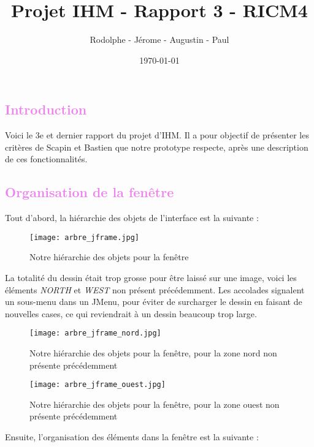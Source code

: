 \documentclass[12pt, a4paper]{article}
\title{Projet IHM - Rapport 3 - RICM4}
\author{\bsc{Fréby} Rodolphe - \bsc{Barbier} Jérome - \bsc{Husson} Augustin - \bsc{Labat} Paul}
\date{\today}
\begin{document}
\maketitle
\tableofcontents
\newpage

\textcolor{Violet}{\section{Introduction}}
Voici le 3e et dernier rapport du projet d'IHM. Il a pour objectif de présenter les critères de Scapin et Bastien que notre prototype respecte, après une description de ces fonctionnalités.

\textcolor{Violet}{\section{Organisation de la fenêtre}}

Tout d'abord, la hiérarchie des objets de l'interface est la suivante :

\begin{figure}[h]
\begin{center}
   \texttt{[image: arbre\_jframe.jpg]}
	\caption{Notre hiérarchie des objets pour la fenêtre}
	\end{center}
\end{figure}

La totalité du dessin était trop grosse pour être laissé sur une image, voici les éléments \emph{NORTH} et \emph{WEST} non présent précédemment. Les accolades signalent un sous-menu dans un JMenu, pour éviter de surcharger le dessin en faisant de nouvelles cases, ce qui reviendrait à un dessin beaucoup trop large.
\newpage
\begin{figure}[h]
\begin{center}
   \texttt{[image: arbre\_jframe\_nord.jpg]}
	\caption{Notre hiérarchie des objets pour la fenêtre, pour la zone nord non présente précédemment}
	\end{center}
\end{figure}

\begin{figure}[h]
\begin{center}
   \texttt{[image: arbre\_jframe\_ouest.jpg]}
	\caption{Notre hiérarchie des objets pour la fenêtre,  pour la zone ouest non présente précédemment}
	\end{center}
\end{figure}
\newpage
Ensuite, l'organisation des éléments dans la fenêtre est la suivante :
\end{document}
